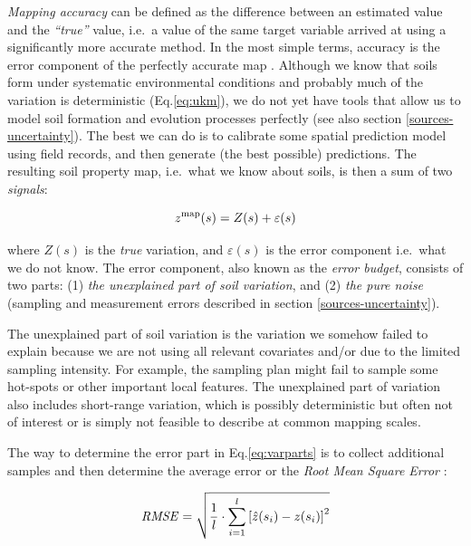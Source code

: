 \documentclass[graybox,natbib,nospthms,UStrade]{svmono}
\begin{document}
\emph{Mapping accuracy} can be defined as the difference between an estimated
value and the \emph{``true''} value, i.e.~a value of the same target variable
arrived at using a significantly more accurate method.
In the most simple terms, accuracy is the error component of the
perfectly accurate map \citep{mowrer2000quantifying}. Although we know that
soils form under systematic environmental conditions and probably much
of the variation is deterministic (Eq.\eqref{eq:ukm}), we do not yet have
tools that allow us to model soil formation and evolution processes
perfectly (see also section \ref{sources-uncertainty}).
The best we can do is to calibrate some spatial prediction model
using field records, and then generate
(the best possible) predictions. The resulting soil property map,
i.e.~what we know about soils, is then a sum of two \emph{signals}:

\begin{equation}
z^{\rm{map}}({{s}}) = Z({{s}}) + \varepsilon({{s}})
\label{eq:varparts}
\end{equation}

where \(Z({{s}})\) is the \emph{true} variation, and \(\varepsilon({{s}})\)
is the error component i.e.~what we do not know. The error component,
also known as the \emph{error budget}, consists of two parts: (1)
\emph{the unexplained part of soil variation}, and (2) \emph{the pure noise}
(sampling and measurement errors described in
section \ref{sources-uncertainty}).

The unexplained part of soil variation is the variation we somehow
failed to explain because we are not using all relevant covariates
and/or due to the limited sampling intensity. For example, the sampling
plan might fail to sample some hot-spots or other important local features. The
unexplained part of variation also includes short-range variation, which
is possibly deterministic but often not of interest or is simply not
feasible to describe at common mapping scales.

The way to determine the error part in Eq.\eqref{eq:varparts} is to
collect additional samples and then determine the average error or the
\emph{Root Mean Square Error} \citep{goovaerts2001geostatistical, Finke2006Elsevier, LiHeap2010EI}:

\begin{equation}
{\it RMSE} = \sqrt {\frac{1}{l} \cdot \sum\limits_{i = 1}^l {\left[
{\hat z({{s}}_i ) - z ({{s}}_i )} \right]^2 } }
\label{eq:RMSE}
\end{equation}
\end{document}
